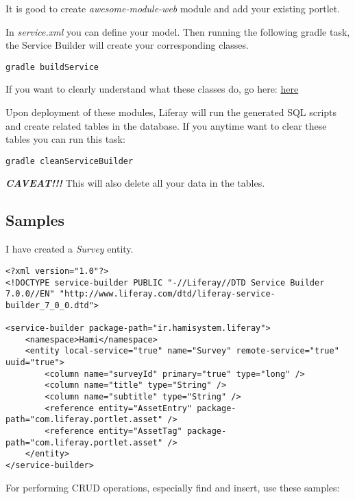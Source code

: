 It is good to create \textit{awesome-module-web} module and add your existing portlet.

In \textit{service.xml} you can define your model. Then running the following gradle task, the Service Builder will create your corresponding classes.

\lstset{language=bash}
\begin{lstlisting}
gradle buildService
\end{lstlisting}

If you want to clearly understand what these classes do, go here: \href{https://dev.liferay.com/develop/tutorials/-/knowledge_base/7-0/running-service-builder-and-understanding-the-generated-code}{here}

Upon deployment of these modules, Liferay will run the generated SQL scripts and create related tables in the database. If you anytime want to clear these tables you can run this task:

\lstset{language=bash}
\begin{lstlisting}
gradle cleanServiceBuilder
\end{lstlisting}

\textit{\textbf{CAVEAT!!!}} This will also delete all your data in the tables.
\subsection{Samples}
I have created a \textit{Survey} entity.

\lstset{language=xml}
\begin{minipage}{\linewidth}
\begin{lstlisting}[caption=service.xml]
<?xml version="1.0"?>
<!DOCTYPE service-builder PUBLIC "-//Liferay//DTD Service Builder 7.0.0//EN" "http://www.liferay.com/dtd/liferay-service-builder_7_0_0.dtd">

<service-builder package-path="ir.hamisystem.liferay">
	<namespace>Hami</namespace>
	<entity local-service="true" name="Survey" remote-service="true" uuid="true">
		<column name="surveyId" primary="true" type="long" />
		<column name="title" type="String" />
		<column name="subtitle" type="String" />
		<reference entity="AssetEntry" package-path="com.liferay.portlet.asset" />
		<reference entity="AssetTag" package-path="com.liferay.portlet.asset" />
	</entity>
</service-builder>
\end{lstlisting}
\end{minipage}

For performing CRUD operations, especially find and insert, use these samples:


